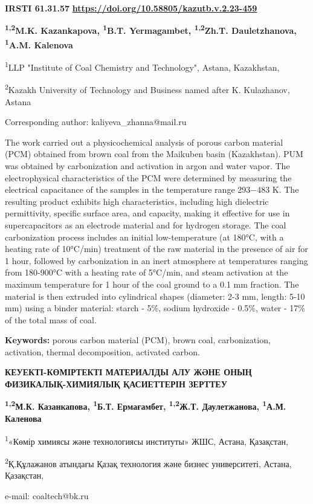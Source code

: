 \newpage
{}
{\bfseries IRSTI 61.31.57}
\hfill {\bfseries \href{https://doi.org/10.58805/kazutb.v.2.23-459}{https://doi.org/10.58805/kazutb.v.2.23-459}}


\begin{center}
{\bfseries \textsuperscript{1,2}M.K. Kazankapova, \textsuperscript{1}B.T. Yermagambet, \textsuperscript{1,2}Zh.T. Dauletzhanova\envelope, \textsuperscript{1}A.M. Kalenova}

\textsuperscript{1}LLP "Institute of Coal Chemistry and Technology",
Astana, Kazakhstan,

\textsuperscript{2}Kazakh University of Technology and Business named
after K. Kulazhanov, Astana

\envelope Corresponding author: kaliyeva\_zhanna@mail.ru
\end{center}

The work carried out a physicochemical analysis of porous carbon
material (PCM) obtained from brown coal from the Maikuben basin
(Kazakhstan). PUM was obtained by carbonization and activation in argon
and water vapor. The electrophysical characteristics of the PCM were
determined by measuring the electrical capacitance of the samples in the
temperature range 293−483 K. The resulting product exhibits high
characteristics, including high dielectric permittivity, specific
surface area, and capacity, making it effective for use in
supercapacitors as an electrode material and for hydrogen storage. The
coal carbonization process includes an initial low-temperature (at
180°C, with a heating rate of 10°C/min) treatment of the raw material in
the presence of air for 1 hour, followed by carbonization in an inert
atmosphere at temperatures ranging from 180-900°C with a heating rate of
5°C/min, and steam activation at the maximum temperature for 1 hour of
the coal ground to a 0.1 mm fraction. The material is then extruded into
cylindrical shapes (diameter: 2-3 mm, length: 5-10 mm) using a binder
material: starch - 5\%, sodium hydroxide - 0.5\%, water - 17\% of the
total mass of coal.

{\bfseries Keywords:} porous carbon material (PCM), brown coal,
carbonization, activation, thermal decomposition, activated carbon.

\begin{center}
{\large\bfseries КЕУЕКТІ-КӨМІРТЕКТІ МАТЕРИАЛДЫ АЛУ ЖӘНЕ ОНЫҢ ФИЗИКАЛЫҚ-ХИМИЯЛЫҚ
ҚАСИЕТТЕРІН ЗЕРТТЕУ}

{\bfseries \textsuperscript{1,2}М.К. Казанкапова, \textsuperscript{1}Б.Т. Ермағамбет, \textsuperscript{1,2}Ж.Т. Даулетжанова\envelope, \textsuperscript{1}А.М. Каленова}

\textsuperscript{1}«Көмір химиясы және технологиясы институты» ЖШС,
Астана, Қазақстан,

\textsuperscript{2}Қ.Құлажанов атындағы Қазақ технология және бизнес
университеті, Астана, Қазақстан,

e-mail: coaltech@bk.ru
\end{center}

